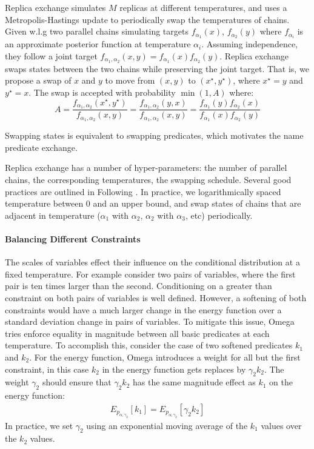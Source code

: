Replica exchange simulates $M$ replicas at different temperatures, and uses a Metropolis-Hastings update to  periodically swap the temperatures of chains.
Given w.l.g two parallel chains simulating targets $f_{\alpha_1}(x)$, $f_{\alpha_2}(y)$ where $f_{\alpha_i}$ is an approximate posterior function at temperature $\alpha_i$.
Assuming independence, they follow a joint target $f_{\alpha_1, \alpha_2}(x,y) = f_{\alpha_1}(x)f_{\alpha_2}(y)$.
Replica exchange swaps states between the two chains while preserving the joint target.
That is, we propose a swap of $x$ and $y$ to move from $(x, y)$ to $(x^\star,y^\star)$, where $x^\star=y$ and $y^\star=x$.
The swap is accepted with probability $\min(1, A)$ where:
\begin{equation}
A = \frac{f_{\alpha_1, \alpha_2}(x^\star,y^\star)}{f_{\alpha_1, \alpha_2}(x,y)} = \frac{f_{\alpha_1, \alpha_2}(y,x)}{f_{\alpha_1, \alpha_2}(x,y)} = \frac{f_{\alpha_1}(y)f_{\alpha_2}(x)}{f_{\alpha_1}(x)f_{\alpha_2}(y)}
\end{equation}

Swapping states is equivalent to swapping predicates, which motivates the name predicate exchange.

Replica exchange has a number of hyper-parameters: the number of parallel chains, the corresponding temperatures, the swapping schedule.
Several good practices are outlined in Following \cite{earl2005parallel}.  In practice, we logarithmically spaced temperature between $0$ and an upper bound, and swap states of chains that are adjacent in temperature ($\alpha_1$ with $\alpha_2$, $\alpha_2$ with $\alpha_3$, etc) periodically.



\paragraph{Balancing Different Constraints}
The scales of variables effect their influence on
the conditional distribution at a fixed temperature.
For example consider two pairs of variables, where
the first pair is ten times larger than the second.
Conditioning on a greater than constraint on both
pairs of variables is well defined. However,
a softening of both constraints would have 
a much larger change in the energy function over
a standard deviation change in pairs of variables.
To mitigate this issue, Omega tries enforce equality
in magnitude between all basic predicates at each temperature.
To accomplish this, consider the case of two 
softened predicates $k_1$ and $k_2$. For the
energy function, Omega introduces a weight
for all but the first constraint, in this
case $k_2$ in the energy function gets replaces
by $\gamma_2 k_2$. The weight $\gamma_2$ should
ensure that $\gamma_2 k_2$ has the same
magnitude effect as $k_1$ on the energy
function:
\begin{align*}
E_{p_{\alpha, \gamma_2}}[k_1] = E_{p_{\alpha, \gamma_2}}[\gamma_2 k_2] 
\end{align*}
In practice, we set $\gamma_2$ using an exponential moving
average of the $k_1$ values over the $k_2$ values.

